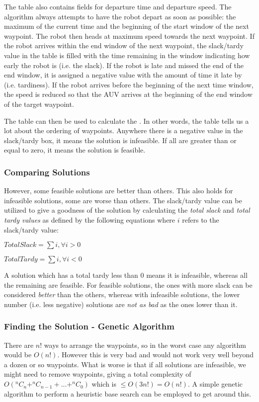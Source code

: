 The table also contains fields for departure time and departure speed. The algorithm always attempts to have the robot depart as soon as possible: the maximum of the current time and the beginning of the start window of the next waypoint. The robot then heads at maximum speed towards the next waypoint. If the robot arrives within the end window of the next waypoint, the slack/tardy value in the table is filled with the time remaining in the window indicating how early the robot is (i.e. the slack). If the robot is late and missed the end of the end window, it is assigned a negative value with the amount of time it late by (i.e. tardiness). If the robot arrives before the beginning of the next time window, the speed is reduced so that the AUV arrives at the beginning of the end window of the target waypoint. 

The table can then be used to calculate the . In other words, the table tells us a lot about the ordering of waypoints. Anywhere there is a negative value in the slack/tardy box, it means the solution is infeasible. If all are greater than or equal to zero, it means the solution is feasible. 

\subsubsection{Comparing Solutions}
However, some feasible solutions are better than others. This also holds for infeasible solutions, some are worse than others. The slack/tardy value can be utilized to give a goodness of the solution by calculating the \emph{total slack} and \emph{total tardy values} as defined by the following equations where $i$ refers to the slack/tardy value:

\begin{center}
$TotalSlack = \sum{i}, \forall i > 0$

$TotalTardy = \sum{i}, \forall i < 0$
\end{center}

A solution which has a total tardy less than 0 means it is infeasible, whereas all the remaining are feasible. For feasible solutions, the ones with more slack can be considered \textit{better} than the others, whereas with infeasible solutions, the lower number (i.e. less negative) solutions are \textit{not as bad} as the ones lower than it.

\subsubsection{Finding the Solution - Genetic Algorithm}
There are $n!$ ways to arrange the waypoints, so in the worst case any algorithm would be $O(n!)$. However this is very bad and would not work very well beyond a dozen or so waypoints. What is worse is that if all solutions are infeasible, we might need to remove waypoints, giving a total complexity of $O(^nC_n + ^nC_{n-1} + ... + ^ nC_0)$ which is $\le O(3n!) = O(n!)$. A simple genetic algorithm to perform a heuristic base search can be employed to get around this.

